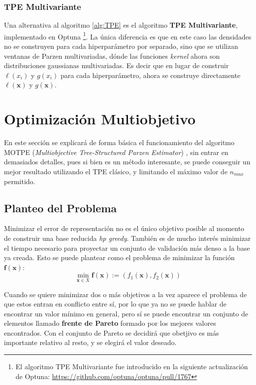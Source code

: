  
 
 
\subsubsection*{TPE Multivariante} 

Una alternativa al algoritmo \ref{alg:TPE} es el algoritmo \textbf{TPE Multivariante}, implementado en Optuna \footnote{El algoritmo TPE Multivariante fue introducido en la siguiente actualización de Optuna: \url{https://github.com/optuna/optuna/pull/1767}}. La única diferencia es que en este caso las densidades no se construyen para cada hiperparámetro por separado, sino que se utilizan ventanas de Parzen multivariadas, dónde las funciones \textit{kernel} ahora son distribuciones gaussianas multivariadas. Es decir que en lugar de construir $\ell(x_i)$ y $g(x_i)$ para cada hiperparámetro, ahora se construye directamente $\ell(\textbf{x})$ y $g(\textbf{x})$.


\section{Optimización Multiobjetivo}

En este sección se explicará de forma básica el funcionamiento del algoritmo MOTPE (\textit{Multiobjective Tree-Structured Parzen Estimator}) \cite{10.1613/jair.1.13188, 10.1145/3377930.3389817}, sin entrar en demasiados detalles, pues si bien es un método interesante, se puede conseguir un mejor resultado utilizando el TPE clásico, y limitando el máximo valor de $n_{max}$ permitido. 

\subsection{Planteo del Problema}

Minimizar el error de representación no es el único objetivo posible al momento de construir una base reducida \textit{hp greedy}. También es de mucho interés minimizar el tiempo necesario para proyectar un conjunto de validación más denso a la base ya creada.
Esto se puede plantear como el problema de minimizar la función $\textbf{f}(\textbf{x})$:
\[
 \min_{\textbf{x} \in X} \textbf{f}(\textbf{x}) := (f_1(\textbf{x}), f_2(\textbf{x}))
\]

Cuando se quiere minimizar dos o más objetivos a la vez aparece el problema de que estos entran en conflicto entre sí, por lo que ya no se puede hablar de encontrar un valor mínimo en general, pero sí se puede encontrar un conjunto de elementos llamado \textbf{frente de Pareto} formado por los mejores valores encontrados. Con el conjunto de Pareto se decidirá que obetjivo es más importante relativo al resto, y se elegirá el valor deseado.

